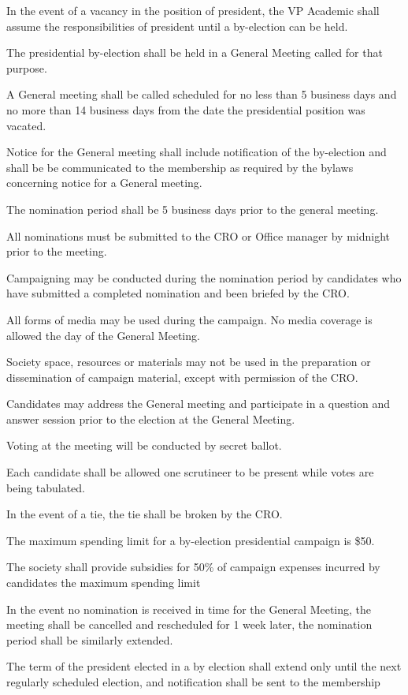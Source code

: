 \begin{longenum}[ label*=\thesubsection.\arabic*., align=left]
	\item In the event of a vacancy in the position of president, the VP Academic shall assume the responsibilities of president until a by-election can be held.
	\item The presidential by-election shall be held in a General Meeting called for that purpose.
	\item A General meeting shall be called scheduled for no less than 5 business days and no more than 14 business days from the date the presidential position was vacated. 
	\item Notice for the General meeting shall include notification of the by-election and shall be be communicated to the membership as required by the bylaws concerning notice for a General meeting.
	\item The nomination period shall be 5 business days prior to the general meeting.
	\item All nominations must be submitted to the CRO or Office manager by midnight prior to the meeting.
	\item Campaigning may be conducted during the nomination period by candidates who have submitted a completed nomination and been briefed by the CRO.
	\item All forms of media may be used during the campaign. No media coverage is allowed the day of the General Meeting.  
	\item Society space, resources or materials may not be used in the preparation or dissemination of campaign material, except with permission of the CRO.
	\item Candidates may address the General meeting and participate in a question and answer session prior to the election at the General Meeting.
	\item Voting at the meeting will be conducted by secret ballot.
	\item Each candidate shall be allowed one scrutineer to be present while votes are being tabulated.
	\item In the event of a tie, the tie shall be broken by the CRO.
	\item The maximum spending limit for a by-election presidential campaign is \$50.
	\item The society shall provide subsidies for 50\% of campaign expenses incurred by candidates the maximum spending limit
	\item In the event no nomination is received in time for the General Meeting, the meeting shall be cancelled and  rescheduled for 1 week later, the nomination period shall be similarly extended.
	\item The term of the president elected in a by election shall extend only until the next regularly scheduled election, and notification shall be sent to the membership
\end{longenum}

